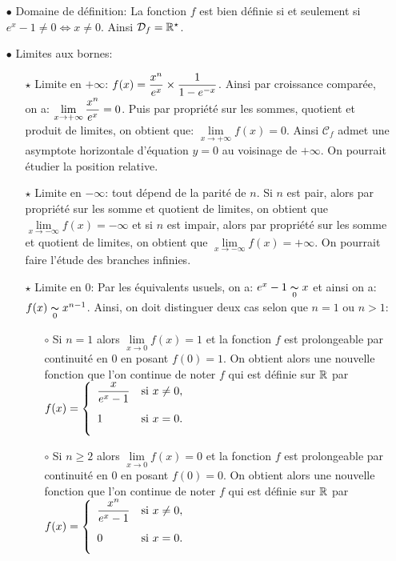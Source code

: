 \documentclass[a4paper, 11pt,reqno]{article}
\begin{document}
\begin{correction}   \;
	\begin{itemize}
		\item[$\bullet$] Domaine de d\'efinition: La fonction $f$ est bien d\'efinie si et seulement si $e^x-1\not= 0\Leftrightarrow x\not= 0$. Ainsi $\mathcal{D}_f=\mathbb{R}^{\star}$.
		\item[$\bullet$] Limites aux bornes:
		      \begin{itemize}
			      \item[$\star$] Limite en $+\infty$: $f(x)=\displaystyle\frac{x^n}{e^x}\times \displaystyle\frac{1}{1-e^{-x}}$. Ainsi par croissance compar\'ee, on a: $\lim\limits_{x\to +\infty} \displaystyle\frac{x^n}{e^x}=0$. Puis par propri\'et\'e sur les sommes, quotient et produit de limites, on obtient que: $\lim\limits_{x\to +\infty} f(x)=0$. Ainsi $\mathcal{C}_f$ admet une asymptote horizontale d'\'equation $y=0$ au voisinage de $+\infty$. On pourrait \'etudier la position relative.
			      \item[$\star$] Limite en $-\infty$: tout d\'epend de la parit\'e de $n$. Si $n$ est pair, alors par propri\'et\'e sur les somme et quotient de limites, on obtient que $\lim\limits_{x\to -\infty} f(x)=-\infty$ et si $n$ est impair, alors par propri\'et\'e sur les somme et quotient de limites, on obtient que $\lim\limits_{x\to -\infty} f(x)=+\infty$. On pourrait faire l'\'etude des branches infinies.
			      \item[$\star$] Limite en 0: Par les \'equivalents usuels, on a: $e^x-1\underset{0}{\thicksim} x$ et ainsi on a: $f(x)\underset{0}{\thicksim} x^{n-1}$. Ainsi, on doit distinguer deux cas selon que $n=1$ ou $n>1$:
			            \begin{itemize}
				            \item[$\circ$] Si $n=1$ alors $\lim\limits_{x\to 0} f(x)=1$ et la fonction $f$ est prolongeable par continuit\'e en 0 en posant $f(0)=1$. On obtient alors une nouvelle fonction que l'on continue de noter $f$ qui est d\'efinie sur $\mathbb{R}$ par
				                  $f(x)=\left\lbrace \begin{array}{ll} \ddp\frac{x}{e^x-1}& \hbox{si}\ x\not= 0,\vsec\\ 1 & \hbox{si}\ x=0.\vsec \end{array}\right.$
				            \item[$\circ$] Si $n\geq 2$ alors $\lim\limits_{x\to 0} f(x)=0$ et la fonction $f$ est prolongeable par continuit\'e en 0 en posant $f(0)=0$. On obtient alors une nouvelle fonction que l'on continue de noter $f$ qui est d\'efinie sur $\mathbb{R}$ par $f(x)=\left\lbrace \begin{array}{ll} \ddp\frac{x^n}{e^x-1}& \hbox{si}\ x\not= 0,\vsec\\ 0 & \hbox{si}\ x=0.\vsec \end{array}\right.$

\end{itemize}
\end{itemize}
\end{itemize}
\end{correction}
\end{document}
